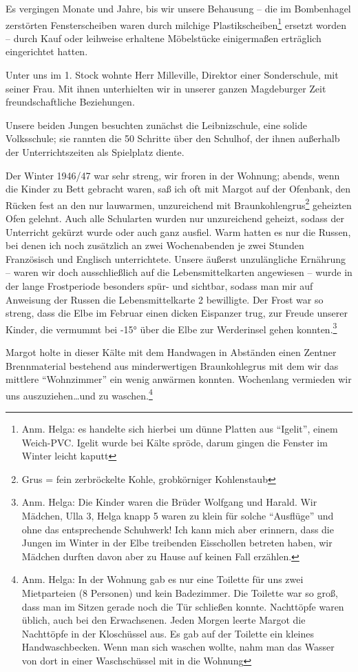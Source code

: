 \documentclass[a5paper,pagesize,10pt,twoside=true]{scrbook}
\renewcommand{\marginpar}[2][]{}
\begin{document}
Es vergingen Monate und Jahre, bis wir unsere Behausung -- die im Bombenhagel zerstörten Fensterscheiben waren durch milchige Plastikscheiben\footnote{Anm. Helga: es handelte sich hierbei um dünne Platten aus \enquote{Igelit}, einem Weich-PVC. Igelit wurde bei Kälte spröde, darum gingen die Fenster im Winter leicht kaputt} ersetzt worden -- durch Kauf oder leihweise erhaltene Möbelstücke einigermaßen erträglich eingerichtet hatten.

Unter uns im 1. Stock wohnte Herr Milleville, Direktor einer Sonderschule, mit seiner Frau. Mit ihnen unterhielten wir in unserer ganzen Magdeburger Zeit freundschaftliche Beziehungen.

Unsere beiden Jungen besuchten zunächst die Leibnizschule, eine solide Volksschule; sie rannten die 50 Schritte über den Schulhof, der ihnen außerhalb der Unterrichtszeiten als Spielplatz diente.

Der Winter 1946/47 war sehr streng, wir froren in der Wohnung; abends, wenn die Kinder zu Bett gebracht waren, saß ich oft mit Margot auf der Ofenbank, den Rücken fest an den nur lauwarmen, unzureichend mit Braunkohlengrus\footnote{Grus = fein zerbröckelte Kohle, grobkörniger Kohlenstaub} geheizten Ofen gelehnt. Auch alle Schularten wurden nur unzureichend geheizt, sodass der Unterricht gekürzt wurde oder auch ganz ausfiel. Warm hatten es \marginpar{136} nur die Russen, bei denen ich noch zusätzlich an zwei Wochenabenden je zwei Stunden Französisch und Englisch unterrichtete. Unsere äußerst unzulängliche Ernährung -- waren wir doch ausschließlich auf die Lebensmittelkarten angewiesen -- wurde in der lange Frostperiode besonders spür- und sichtbar, sodass man mir auf Anweisung der Russen die Lebensmittelkarte 2 bewilligte. Der Frost war so streng, dass die Elbe im Februar einen dicken Eispanzer trug, zur Freude unserer Kinder, die vermummt bei -15° über die Elbe zur Werderinsel gehen konnten.\footnote{Anm. Helga: Die Kinder waren die Brüder Wolfgang und Harald. Wir Mädchen, Ulla 3, Helga knapp 5 waren zu klein für solche \enquote{Ausflüge} und ohne das entsprechende Schuhwerk! Ich kann mich aber erinnern, dass die Jungen im Winter in der Elbe treibenden Eisschollen betreten haben, wir Mädchen durften davon aber zu Hause auf keinen Fall erzählen.}

Margot holte in dieser Kälte mit dem Handwagen in Abständen einen Zentner Brennmaterial bestehend aus minderwertigen Braunkohlegrus mit dem wir das mittlere \enquote{Wohnzimmer} ein wenig anwärmen konnten. Wochenlang vermieden wir uns auszuziehen\dots und zu waschen.\footnote{Anm. Helga: In der Wohnung gab es nur eine Toilette für uns zwei Mietparteien (8 Personen) und kein Badezimmer. Die Toilette war so groß, dass man im Sitzen gerade noch die Tür schließen konnte. Nachttöpfe waren üblich, auch bei den Erwachsenen. Jeden Morgen leerte Margot die Nachttöpfe in der Kloschüssel aus. Es gab auf der Toilette ein kleines Handwaschbecken. Wenn man sich waschen wollte, nahm man das Wasser von dort in einer Waschschüssel mit in die Wohnung}
\end{document}
